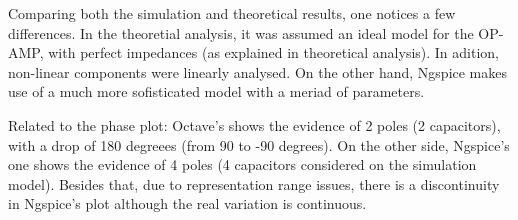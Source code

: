 \vspace{3mm}
\par Comparing both the simulation and theoretical results, one notices a few differences. In the theoretial analysis, it was assumed an ideal model for the OP-AMP, with perfect impedances (as explained in theoretical analysis). In adition, non-linear components were linearly analysed. On the other hand, Ngspice makes use of a much more sofisticated model with a meriad of parameters.
\vspace{3mm}
\par Related to the phase plot: Octave's shows the evidence of 2 poles (2 capacitors), with a drop of 180 degreees (from 90 to -90 degrees). On the other side, Ngspice's one shows the evidence of 4 poles (4 capacitors considered on the simulation model). Besides that, due to representation range issues, there is a discontinuity in Ngspice's plot although the real variation is continuous.    
\vspace{5mm}